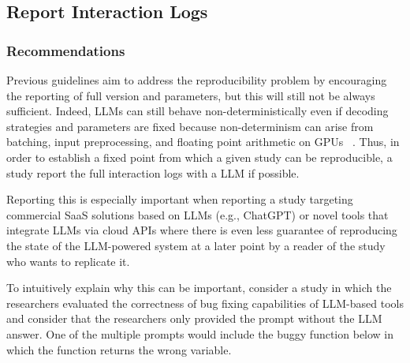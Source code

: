 



\subsection{Report Interaction Logs}

\subsubsection{Recommendations}


Previous guidelines aim to address the reproducibility problem by encouraging the reporting of full version and parameters, but this will still not be always sufficient. Indeed, LLMs can still behave non-deterministically even if decoding strategies and parameters are fixed because non-determinism can arise from batching, input preprocessing, and floating point arithmetic on GPUs ~\cite{Chann2023}. Thus, in order to establish a fixed point from which a given study can be reproducible, a study \should report the full interaction logs with a LLM if possible. 

Reporting this is especially important when reporting a study targeting commercial SaaS solutions based on LLMs (e.g., ChatGPT) or novel tools that integrate LLMs via cloud APIs where there is even less guarantee of reproducing the state of the LLM-powered system at a later point by a reader of the study who wants to replicate it. 

To intuitively explain why this can be important, consider a study in which the researchers evaluated the correctness of bug fixing capabilities of LLM-based tools and consider that the researchers only provided the prompt without the LLM answer. One of the multiple prompts would include the buggy function below in which the function returns the wrong variable. 


